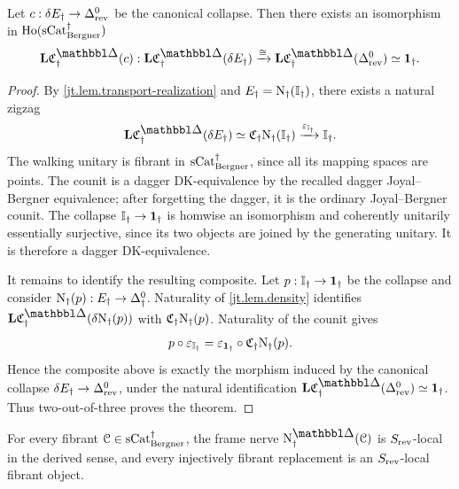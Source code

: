 \documentclass[a4paper,dvipdfmx,11pt]{amsart}
\begin{document}
\begin{proposition}\label{jt.thm.interval}
  Let $c:\delta E_{\dag}\to\Delta^0_{\mathrm{rev}}$ be the canonical collapse.
  Then there exists an isomorphism in $\mathrm{Ho}(\mathrm{sCat}^{\dag}_{\mathrm{Bergner}})$
  \begin{align}
    \bfL\frakC^{\prism}_{\dag}(c):
    \bfL\frakC^{\prism}_{\dag}(\delta E_{\dag})
    \xrightarrow{\cong}
    \bfL\frakC^{\prism}_{\dag}(\Delta^0_{\rev})
    \simeq 
    \bfone_{\dag}.
  \end{align}
\end{proposition}

\begin{proof}
  By \cref{jt.lem.transport-realization} and $E_{\dag}=\mathrm{N}_{\dag}(\mathbb{I}_{\dag})$, there exists a natural zigzag
  \begin{align}
    \bfL\frakC^{\prism}_{\dag}(\delta E_{\dag})\simeq \frakC_{\dag}\N_{\dag}(\bbI_{\dag}) \xrightarrow{\varepsilon_{\bbI_{\dag}}} \bbI_{\dag}.
  \end{align}
  The walking unitary is fibrant in $\mathrm{sCat}^{\dag}_{\mathrm{Bergner}}$, since all its mapping spaces are points.
  The counit is a dagger DK-equivalence by the recalled dagger Joyal--Bergner equivalence;
  after forgetting the dagger, it is the ordinary Joyal--Bergner counit.
  The collapse $\mathbb{I}_{\dag}\to\mathbf{1}_{\dag}$ is homwise an isomorphism and coherently unitarily essentially surjective, since its two objects are joined by the generating unitary.
  It is therefore a dagger DK-equivalence.

  It remains to identify the resulting composite.
  Let $p:\mathbb{I}_{\dag}\to\mathbf{1}_{\dag}$ be the collapse and consider $\mathrm{N}_{\dag}(p):E_{\dag}\to\Delta^0_{\dag}$.
  Naturality of \cref{jt.lem.density} identifies $\bfL\frakC^{\prism}_{\dag}(\delta \N_{\dag}(p))$ with $\mathfrak{C}_{\dag}\mathrm{N}_{\dag}(p)$.
  Naturality of the counit gives 
  \begin{align}
    p\circ\varepsilon_{\mathbb{I}_{\dag}}=\varepsilon_{\mathbf{1}_{\dag}}\circ\mathfrak{C}_{\dag}\mathrm{N}_{\dag}(p).
  \end{align}
  Hence the composite above is exactly the morphism induced by the canonical collapse $\delta E_{\dag}\to\Delta^0_{\mathrm{rev}}$, under the natural identification $\bfL\frakC^{\prism}_{\dag}(\Delta^0_{\rev})\simeq\bfone_{\dag}$.
  Thus two-out-of-three proves the theorem.
\end{proof}

\begin{proposition}\label{jt.cor.local}
  For every fibrant $\mathcal{C}\in\mathrm{sCat}^{\dag}_{\mathrm{Bergner}}$, the frame nerve $\N^{\prism}_{\dag}(\calC)$ is $S_{\mathrm{rev}}$-local in the derived sense, and every injectively fibrant replacement is an $S_{\mathrm{rev}}$-local fibrant object.
\end{proposition}
\end{document}
